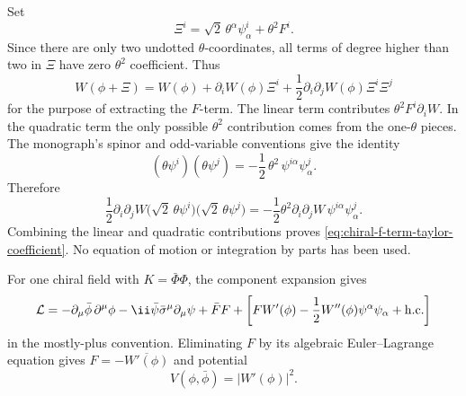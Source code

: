 Set
\[
  \Xi^i=\sqrt2\,\theta^\alpha\psi^i_\alpha+\theta^2F^i .
\]
Since there are only two undotted \(\theta\)-coordinates, all terms of
degree higher than two in \(\Xi\) have zero \(\theta^2\) coefficient.  Thus
\[
  W(\phi+\Xi)
  =
  W(\phi)+\partial_iW(\phi)\Xi^i
  +\frac12\partial_i\partial_jW(\phi)\Xi^i\Xi^j
\]
for the purpose of extracting the \(F\)-term.  The linear term contributes
\(\theta^2F^i\partial_iW\).  In the quadratic term the only possible
\(\theta^2\) contribution comes from the one-\(\theta\) pieces.  The
monograph's spinor and odd-variable conventions give the identity
\begin{equation}
  (\theta\psi^i)(\theta\psi^j)
  =
  -\frac12\,\theta^2\,\psi^{i\alpha}\psi^j_\alpha .
  \label{eq:theta-psi-product-identity}
\end{equation}
Therefore
\[
  \frac12\partial_i\partial_jW
  \bigl(\sqrt2\,\theta\psi^i\bigr)
  \bigl(\sqrt2\,\theta\psi^j\bigr)
  =
  -\frac12\theta^2
  \partial_i\partial_jW\,
  \psi^{i\alpha}\psi^j_\alpha .
\]
Combining the linear and quadratic contributions proves
\eqref{eq:chiral-f-term-taylor-coefficient}.  No equation of motion or
integration by parts has been used.

For one chiral field with \(K=\bar\Phi\Phi\), the component expansion gives
\[
  \mathcal L
  =
  -\partial_\mu\bar\phi\,\partial^\mu\phi
  -\ii\bar\psi\bar\sigma^\mu\partial_\mu\psi
  +\bar F F
  +
  \left[
  F W'(\phi)
  -\frac{1}{2}W''(\phi)\psi^\alpha\psi_\alpha
  +{\rm h.c.}
  \right]
\]
in the mostly-plus convention.  Eliminating \(F\) by its algebraic
Euler--Lagrange equation gives \(F=-\overline{W'(\phi)}\) and potential
\[
  V(\phi,\bar\phi)=|W'(\phi)|^2 .
\]

